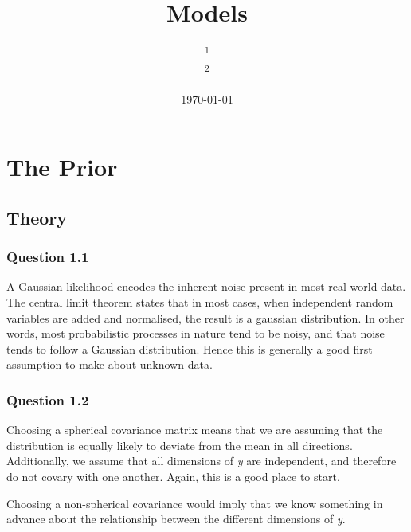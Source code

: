 \documentclass[10pt, a4paper, twocolumn]{article} %
\title{Models} %
\author{
	\authorstyle{Justin Salmon\textsuperscript{1} and George Lancaster\textsuperscript{2}} %
	\newline\newline %
	\textsuperscript{1}\institution{wr18313}\\ %
	\textsuperscript{2}\institution{qv18258} %
}
\date{\today} %
\begin{document}
\maketitle %

\thispagestyle{firstpage} %



\section{The Prior}

\subsection{Theory}

\subsubsection*{Question 1.1}
A Gaussian likelihood encodes the inherent noise present in most real-world data. The central limit theorem states that in most cases, when independent random variables are added and normalised, the result is a gaussian distribution. In other words, most probabilistic processes in nature tend to be noisy, and that noise tends to follow a Gaussian distribution. Hence this is generally a good first assumption to make about unknown data.
\subsubsection*{Question 1.2}
Choosing a spherical covariance matrix means that we are assuming that the distribution is equally likely to deviate from the mean in all directions. Additionally, we assume that all dimensions of \emph{y} are independent, and therefore do not covary with one another. Again, this is a good place to start. \par
Choosing a non-spherical covariance would imply that we know something in advance about the relationship between the different dimensions of \emph{y}.
\end{document}
